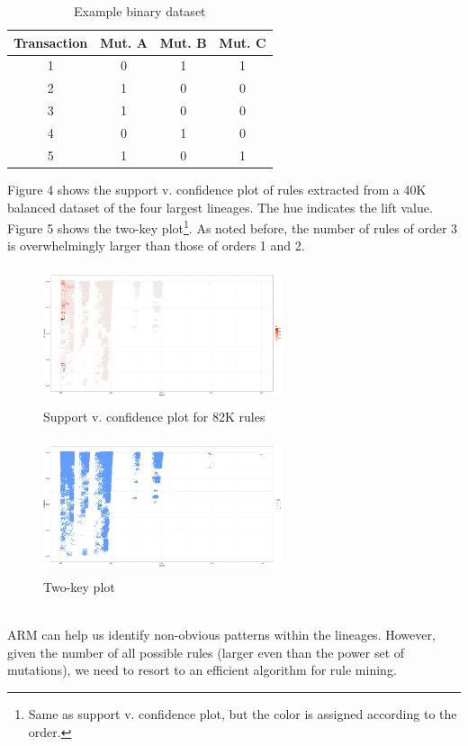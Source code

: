 \documentclass[twoside,twocolumn]{article}
\begin{document}
	\begin{table}
	\caption{Example binary dataset}
	\centering
		\renewcommand{\arraystretch}{1.2} %
	\begin{tabular}{| c | c | c | c | }
		\hline
		Transaction & Mut. A & Mut. B & Mut. C\\
		\hline
		1& 0 & 1 & 1 \\
		2 & 1 & 0&0 \\
		3 & 1 & 0&0 \\
		4 & 0 & 1 &0\\
		5 & 1 & 0 &1\\
		\hline
	\end{tabular}
\end{table}
Figure 4 shows the support v. confidence plot of rules extracted from a 40K balanced dataset of the four largest lineages. The hue indicates the lift value. Figure 5 shows the two-key plot\footnote{Same as support v. confidence plot, but the color is assigned according to the order.}. As noted before, the number of rules of order 3 is overwhelmingly larger than those of orders 1 and 2.
\begin{figure}[h]
	\caption{Support v. confidence plot for 82K rules}
	\label{ruleslift}
	\centering
	\includegraphics[width=70mm, height=40mm]{rules1.png}
\end{figure}
\begin{figure}[h]
	\caption{Two-key plot}
	\label{rulesorder}
	\centering
	\includegraphics[width=70mm, height=40mm]{rules2.png}
\end{figure}
\\
ARM can help us identify non-obvious patterns within the lineages. However, given the number of all possible rules (larger even than the power set of mutations), we need to resort to an efficient algorithm for rule mining.
\end{document}
